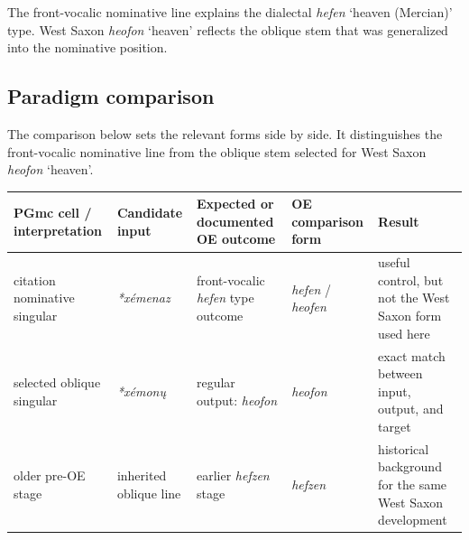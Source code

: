 \documentclass[
  british,
  a4paper,
  openany]{book}
\newcounter{none} %
\begin{document}
The front-vocalic nominative line explains the dialectal {\emph{hefen}}
`heaven (Mercian)' type. West Saxon {\emph{heofon}} `heaven' reflects
the oblique stem that was generalized into the nominative position.

\subsection{Paradigm comparison}\label{paradigm-comparison-8}

The comparison below sets the relevant forms side by side. It
distinguishes the front-vocalic nominative line from the oblique stem
selected for West Saxon {\emph{heofon}} `heaven'.

{\def\LTcaptype{none} %
\begin{longtable}[]{@{}
  >{\raggedright\arraybackslash}p{}
  >{\raggedright\arraybackslash}p{}
  >{\raggedright\arraybackslash}p{}
  >{\raggedright\arraybackslash}p{}
  >{\raggedright\arraybackslash}p{}@{}}
\toprule\noalign{}
\begin{minipage}[b]{\linewidth}\raggedright
PGmc cell / interpretation
\end{minipage} & \begin{minipage}[b]{\linewidth}\raggedright
Candidate input
\end{minipage} & \begin{minipage}[b]{\linewidth}\raggedright
Expected or documented OE outcome
\end{minipage} & \begin{minipage}[b]{\linewidth}\raggedright
OE comparison form
\end{minipage} & \begin{minipage}[b]{\linewidth}\raggedright
Result
\end{minipage} \\
\midrule\noalign{}
\endhead
\bottomrule\noalign{}
\endlastfoot
citation nominative singular & {\emph{*xémenaz}} & front-vocalic
{\emph{hefen}} type outcome & {\emph{hefen}} / {\emph{heofen}} & useful
control, but not the West Saxon form used here \\
selected oblique singular & {\emph{*xémonų}} & regular output:
{\emph{heofon}} & {\emph{heofon}} & exact match between input, output,
and target \\
older pre-OE stage & inherited oblique line & earlier {\emph{hefzen}}
stage & {\emph{hefzen}} & historical background for the same West Saxon
development \\
\end{longtable}
}
\end{document}
